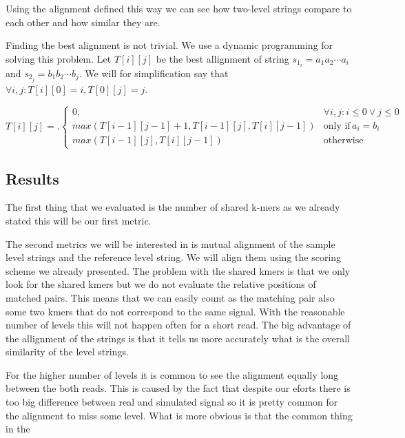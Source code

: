 Using the alignment defined this way we can see how two-level strings compare to
each other and how similar they are.

Finding the best alignment is not trivial. We use a dynamic programming for
solving this problem. Let $T[i][j]$ be the best allignment of string $s_{1_i} = a_1a_2\cdots a_i$
and $s_{2_j} = b_1b_2\cdots b_j$. We will for simplification say that $\forall i, j: T[i][0] = i, T[0][j] = j$.

\[
T[i][j] = \bigl.
  \begin{cases}
    0, & \forall i,j : i\leq 0 \lor j\leq 0 \\
    max(T[i-1][j-1] + 1, T[i-1][j], T[i][j-1]) & \text{only if} \, a_i = b_i \\ 
    max(T[i-1][j], T[i][j-1]) & \text{otherwise}
  \end{cases}
\]

\subsection{Results}

The first thing that we evaluated is the number of shared k-mers as we already
stated this will be our first metric.

The second metrics we will be interested in is mutual alignment of the sample
level strings and the reference level string. We will align them using the scoring
scheme we already presented. The problem with the shared kmers is that we only look
for the shared kmers but we do not evaluate the relative positions of matched pairs.
This means that we can easily count as the matching pair also some two kmers that
do not correspond to the same signal. With the reasonable number of levels this will
not happen often for a short read. The big advantage of the allignment of the strings
is that it tells us more accurately what is the overall similarity of the level strings.

For the higher number of levels it is common to see the alignment equally
long between the both reads. This is caused by the fact that despite our eforts there
is too big difference between real and simulated signal so it is pretty common for
the alignment to miss some level. What is more obvious is that the common thing in
the
